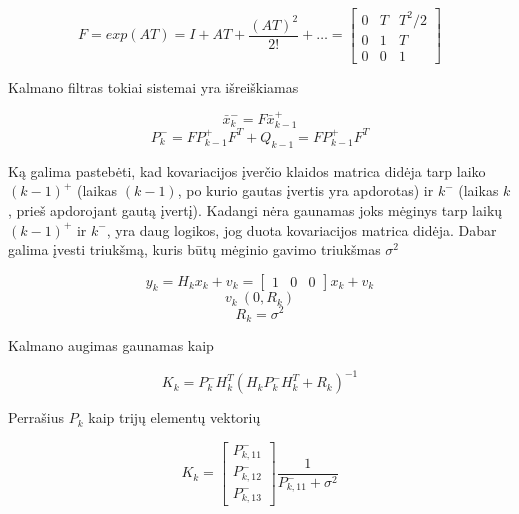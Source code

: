     \begin{equation}
        F = exp(AT) = I + AT + \frac{(AT)^2}{2!} + \dots =
        \begin{bmatrix}
            0 & T & T^2/2 \\
            0 & 1 & T \\
            0 & 0 & 1
        \end{bmatrix}
    \end{equation}

    Kalmano filtras tokiai sistemai yra išreiškiamas

    \begin{equation}
        \bar{x}_k^- = F\bar{x}_{k-1}^+
    \end{equation}
    \begin{equation}
        P_k^- = FP_{k-1}^+ F^T + Q_{k-1} = FP_{k-1}^+ F^T
    \end{equation}

    Ką galima pastebėti, kad kovariacijos įverčio klaidos matrica didėja tarp laiko $(k-1)^+$ (laikas $(k-1)$, po kurio gautas įvertis yra apdorotas) ir $k^-$ (laikas $k$, prieš apdorojant gautą įvertį).
    Kadangi nėra gaunamas joks mėginys tarp laikų $(k-1)^+$ ir $k^-$, yra daug logikos, jog duota kovariacijos matrica didėja.
    Dabar galima įvesti triukšmą, kuris būtų mėginio gavimo triukšmas $\sigma^2$

    \begin{equation}
        y_k = H_kx_k + v_k = \begin{bmatrix} 1 & 0 & 0 \end{bmatrix} x_k + v_k
    \end{equation}
    \begin{equation}
        v_k ~ (0, R_k)
    \end{equation}
    \begin{equation}
        R_k = \sigma^2
    \end{equation}

    Kalmano augimas gaunamas kaip

    \begin{equation}
        K_k = P_k^-H_k^T(H_kP_k^-H_k^T+R_k)^{-1}
    \end{equation}

    Perrašius $P_k$ kaip trijų elementų vektorių

    \begin{equation}
        K_k = \begin{bmatrix} P_{k,11}^- \\ P_{k,12}^- \\ P_{k,13}^- \end{bmatrix} \frac{1}{P_{k,11}^- + \sigma^2}
    \end{equation}

